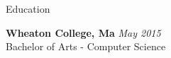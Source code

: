 \documentclass{resume} %
\begin{document}

\begin{rSection}{Education}

{\bf Wheaton College, Ma} \hfill {\em May 2015} \\ 
Bachelor of Arts - Computer Science


\end{rSection}



\end{document}
